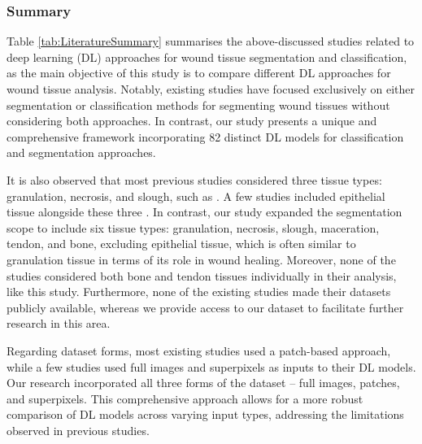 \subsubsection{Summary}
Table \ref{tab:LiteratureSummary} summarises the above-discussed studies related to deep learning (DL) approaches for wound tissue segmentation and classification, as the main objective of this study is to compare different DL approaches for wound tissue analysis. Notably, existing studies have focused exclusively on either segmentation or classification methods for segmenting wound tissues without considering both approaches. In contrast, our study presents a unique and comprehensive framework incorporating 82 distinct DL models for classification and segmentation approaches. 

It is also observed that most previous studies considered three tissue types: granulation, necrosis, and slough, such as \citep{RW37godeiro2018chronic,RW38sarp2021simultaneous,RW25zahia2018tissue,RW29blanco2020superpixel}. A few studies included epithelial tissue alongside these three \citep{RW26nejati2018fine,RW28rajathi2019varicose}. In contrast, our study expanded the segmentation scope to include six tissue types: granulation, necrosis, slough, maceration, tendon, and bone, excluding epithelial tissue, which is often similar to granulation tissue in terms of its role in wound healing. Moreover, none of the studies considered both bone and tendon tissues individually in their analysis, like this study.
Furthermore, none of the existing studies made their datasets publicly available, whereas we provide access to our dataset to facilitate further research in this area. 

Regarding dataset forms, most existing studies used a patch-based approach, while a few studies used full images and superpixels as inputs to their DL models. Our research incorporated all three forms of the dataset -- full images, patches, and superpixels. This comprehensive approach allows for a more robust comparison of DL models across varying input types, addressing the limitations observed in previous studies.
